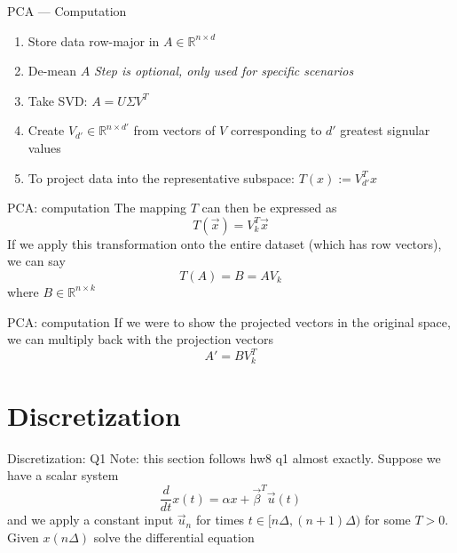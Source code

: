 \documentclass{beamer}
\begin{document}
\begin{frame}{PCA --- Computation}
\begin{enumerate}[<+->]
\item Store data row-major in $A \in \mathbb{R}^{n \times d}$
\item De-mean $A$ \hfill \textit{Step is optional, only used for specific scenarios}
\item Take SVD: $A = U \Sigma V^T$
\item Create $V_{d'} \in \mathbb{R}^{n \times d'}$ from vectors of $V$ corresponding to $d'$ greatest signular values
\item To project data into the representative subspace: $T(x) := V_{d'}^T x$
\end{enumerate}
\end{frame}

\begin{frame}{PCA: computation}
The mapping $T$ can then be expressed as
\[ T(\vec{x}) = V_k^T \vec{x} \]
If we apply this transformation onto the entire dataset (which has row vectors), we can say
\[ T(A) = B = A V_k \]
where $B \in \mathbb{R}^{n \times k}$
\end{frame}
\begin{frame}{PCA: computation}
If we were to show the projected vectors in the original space, we can multiply back with the projection vectors
\[ A' = B V_k^T \]
\end{frame}

\section{Discretization}

\begin{frame}{Discretization: Q1}
Note: this section follows hw8 q1 almost exactly. Suppose we have a scalar system
\[ \frac{d}{dt} x(t) = \alpha x + \vec{\beta}^T \vec u(t) \]
and we apply a constant input $\vec{u}_n$ for times $t \in [n \Delta, (n + 1) \Delta)$ for some $T > 0$. Given $x(n \Delta)$ solve the differential equation
\end{frame}
\end{document}
